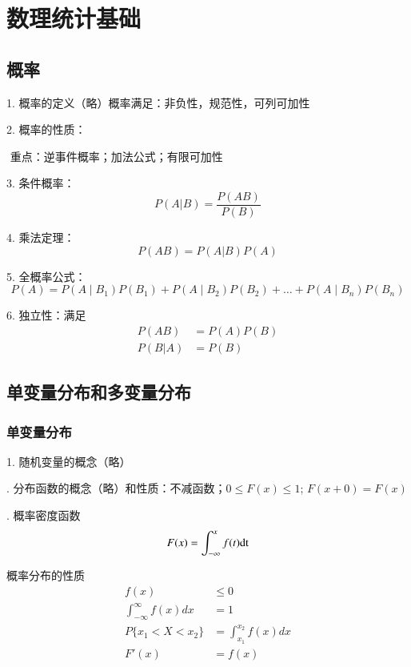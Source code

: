 \chapter{数理统计基础}
\section{概率}

1. 概率的定义（略）概率满足：非负性，规范性，可列可加性

2. 概率的性质：

   ​	重点：逆事件概率；加法公式；有限可加性

3. 条件概率：
\begin{equation}
    P(A|B)=\frac{P(AB)}{P(B)}
\end{equation}

4. 乘法定理：
\begin{equation}
    P(AB)=P(A|B)P(A)
\end{equation}

5. 全概率公式：
\begin{equation}
    P(A)=P\left(A \mid B_{1}\right) P\left(B_{1}\right)+
    P\left(A \mid B_{2}\right) P\left(B_{2}\right)+\ldots+
    P\left(A \mid B_{n}\right) P\left(B_{n}\right)
\end{equation}

6. 独立性：满足
\begin{subequations}
    \begin{align}
        P(AB)&=P(A)P(B) \\ 
        P(B|A)&=P(B)
    \end{align}
\end{subequations}

\section{单变量分布和多变量分布}
\subsection{单变量分布}
\setlength{\parindent}{2em}
1. 随机变量的概念（略）

. 分布函数的概念（略）和性质：不减函数；$0\leq F(x)\leq 1 $; $F(x+0)=F(x)$
 
. 概率密度函数
 \begin{equation}
    F(x)=\int_{-\infty}^{x}f(t) \rm dt
\end{equation}
 
\begin{prop}{概率分布的性质}
    \begin{subequations}
    \begin{align}
        f(x)&\leq 0 \\ 
        \int_{-\infty}^{\infty}f(x)dx&=1\\
        P\{x_1<X<x_2\}&=\int_{x_1}^{x_2}f(x)dx\\
        F'(x)&=f(x)
    \end{align}
    \end{subequations}
\end{prop}
